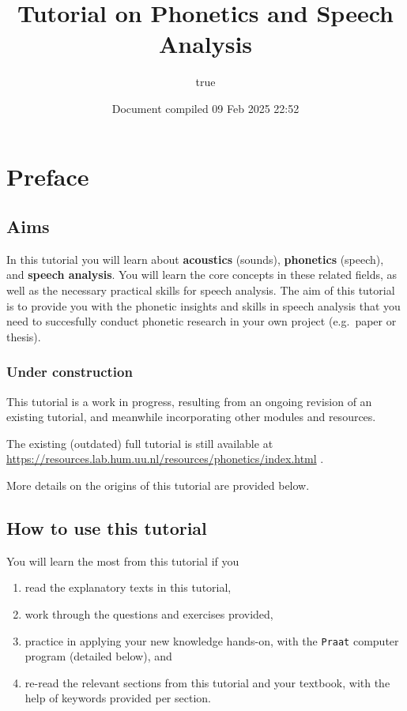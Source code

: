 \documentclass[
]{book}
\title{Tutorial on Phonetics and Speech Analysis}
\author{true}
\date{Document compiled 09 Feb 2025 22:52}
\providecommand{\tightlist}{%
  \setlength{\itemsep}{0pt}\setlength{\parskip}{0pt}}
\begin{document}
\maketitle

{
\setcounter{tocdepth}{1}
\tableofcontents
}
\chapter*{Preface}\label{preface}

\section*{Aims}\label{aims}

In this tutorial you will learn about \textbf{acoustics} (sounds), \textbf{phonetics} (speech), and \textbf{speech analysis}.
You will learn the core concepts in these related fields, as well as the necessary practical skills for speech analysis.
The aim of this tutorial is to provide you with the phonetic insights and skills in speech analysis that you need to succesfully conduct phonetic research in your own project (e.g.~paper or thesis).

\subsection*{Under construction}\label{under-construction}

This tutorial is a work in progress, resulting from an ongoing revision of an existing tutorial, and meanwhile incorporating other modules and resources.

The existing (outdated) full tutorial is still available at \url{https://resources.lab.hum.uu.nl/resources/phonetics/index.html}
.

More details on the origins of this tutorial are provided below.

\section*{How to use this tutorial}\label{how-to-use-this-tutorial}

You will learn the most from this tutorial if you

\begin{enumerate}
\def\labelenumi{(\arabic{enumi})}
\tightlist
\item
  read the explanatory texts in this tutorial,
\item
  work through the questions and exercises provided,
\item
  practice in applying your new knowledge hands-on, with the \texttt{Praat} computer program (detailed below), and
\item
  re-read the relevant sections from this tutorial and your textbook, with the help of keywords provided per section.
\end{enumerate}
\end{document}
